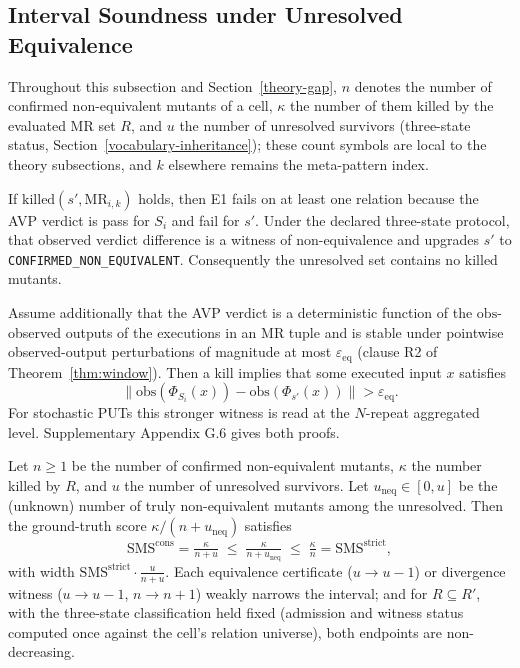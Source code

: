 \documentclass[manuscript,screen,review]{acmart}
\begin{document}
\subsection{Interval Soundness under Unresolved Equivalence}\label{theory-interval}

Throughout this subsection and Section~\ref{theory-gap}, $n$ denotes the
number of confirmed non-equivalent mutants of a cell, $\kappa$ the
number of them killed by the evaluated MR set $R$, and $u$ the number of
unresolved survivors (three-state status,
Section~\ref{vocabulary-inheritance}); these count symbols are local to
the theory subsections, and $k$ elsewhere remains the meta-pattern
index.

\begin{lemma}\label{lem:witness}
If $\mathrm{killed}(s', \mathrm{MR}_{i,k})$ holds, then E1 fails on at
least one relation because the AVP verdict is pass for \(S_i\) and fail
for \(s'\). Under the declared three-state protocol, that observed
verdict difference is a witness of non-equivalence and upgrades \(s'\)
to \texttt{CONFIRMED\_NON\_EQUIVALENT}. Consequently the unresolved set
contains no killed mutants.
\end{lemma}

\begin{proposition}\label{prop:output-witness}
Assume additionally that the AVP verdict is a deterministic function of
the $\mathrm{obs}$-observed outputs of the executions in an MR tuple and
is stable under pointwise observed-output perturbations of magnitude at
most $\varepsilon_{\mathrm{eq}}$ (clause R2 of
Theorem~\ref{thm:window}). Then a kill implies that some executed input
\(x\) satisfies
\[
\|\mathrm{obs}(\Phi_{S_i}(x)) -
  \mathrm{obs}(\Phi_{s'}(x))\| > \varepsilon_{\mathrm{eq}}.
\]
For stochastic PUTs this stronger witness is read at the \(N\)-repeat
aggregated level. Supplementary Appendix G.6 gives both proofs.
\end{proposition}

\begin{theorem}\label{thm:interval}
Let $n \geq 1$ be the number of confirmed non-equivalent mutants,
$\kappa$ the number killed by $R$, and $u$ the number of unresolved
survivors. Let $u_{\mathrm{neq}} \in [0, u]$ be the (unknown) number of
truly non-equivalent mutants among the unresolved. Then the ground-truth
score $\kappa/(n + u_{\mathrm{neq}})$ satisfies
\[ \mathrm{SMS}^{\mathrm{cons}} = \tfrac{\kappa}{n+u} \;\leq\; \tfrac{\kappa}{n+u_{\mathrm{neq}}} \;\leq\; \tfrac{\kappa}{n} = \mathrm{SMS}^{\mathrm{strict}}, \]
with width $\mathrm{SMS}^{\mathrm{strict}} \cdot \tfrac{u}{n+u}$. Each
equivalence certificate ($u \to u-1$) or divergence witness
($u \to u-1$, $n \to n+1$) weakly narrows the interval; and for
$R \subseteq R'$, with the three-state classification held fixed
(admission and witness status computed once against the cell's relation
universe), both endpoints are non-decreasing.
\end{theorem}
\end{document}
